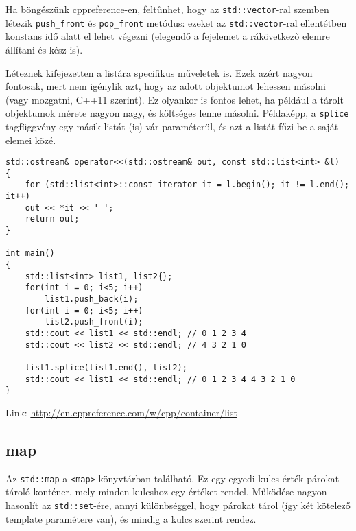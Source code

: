 \documentclass[a4paper,11.5pt,table]{article}
\begin{document}
	\medskip
	Ha böngészünk cppreference-en, feltűnhet, hogy az \texttt{std::vector}-ral szemben létezik \texttt{push\_front} és \texttt{pop\_front} metódus: ezeket az \texttt{std::vector}-ral ellentétben konstans idő alatt el lehet végezni (elegendő a fejelemet a rákövetkező elemre állítani és kész is).
	\medskip
	
	Léteznek kifejezetten a listára specifikus műveletek is. Ezek azért nagyon fontosak, mert nem igénylik azt, hogy az adott objektumot lehessen másolni (vagy mozgatni, C++11 szerint). Ez olyankor is fontos lehet, ha például a tárolt objektumok mérete nagyon nagy, és költséges lenne másolni. Példaképp, a \texttt{splice} tagfüggvény egy másik listát (is) vár paraméterül, és azt a listát fűzi be a saját elemei közé.
\begin{lstlisting}
std::ostream& operator<<(std::ostream& out, const std::list<int> &l)
{
	for (std::list<int>::const_iterator it = l.begin(); it != l.end(); it++)
	out << *it << ' ';
	return out;
}	

int main()
{
	std::list<int> list1, list2{};
	for(int i = 0; i<5; i++)
		list1.push_back(i); 
	for(int i = 0; i<5; i++)
		list2.push_front(i);
	std::cout << list1 << std::endl; // 0 1 2 3 4
	std::cout << list2 << std::endl; // 4 3 2 1 0 
	
	list1.splice(list1.end(), list2);
	std::cout << list1 << std::endl; // 0 1 2 3 4 4 3 2 1 0
}
\end{lstlisting}
	Link: \url{http://en.cppreference.com/w/cpp/container/list}
	\subsection{map}
	Az \texttt{std::map} a \texttt{<map>} könyvtárban található. Ez egy egyedi kulcs-érték párokat tároló konténer, mely minden kulcshoz egy értéket rendel. Működése nagyon hasonlít az \texttt{std::set}-ére, annyi különbséggel, hogy párokat tárol (így két kötelező template paramétere van), és mindig a kulcs szerint rendez.
	\smallskip
	
\end{document}
